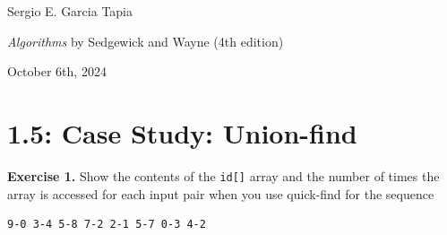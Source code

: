 \documentclass[12pt, a4paper]{article}
\newenvironment{ex}[2][Exercise]
{\par\medskip\noindent \textbf{#1 #2.}}
{\medskip}
\begin{document}
	\noindent Sergio E. Garcia Tapia \hfill
	
	\noindent \emph{Algorithms} by Sedgewick and Wayne (4th edition) \cite{sedgewick_wayne}\hfill
	
	\noindent October 6th, 2024\hfill 
	\section*{1.5: Case Study: Union-find}
	\begin{ex}{1}
		Show the contents of the \texttt{id[]} array and the number of times the array is
		accessed for each input pair when you use quick-find for the sequence
		\begin{lstlisting}[language={}]
9-0 3-4 5-8 7-2 2-1 5-7 0-3 4-2
		\end{lstlisting}
	\end{ex}
\end{document}

